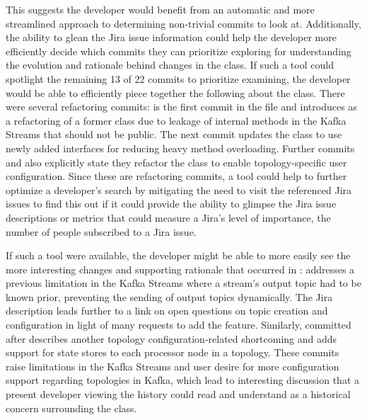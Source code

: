 This suggests the developer would benefit from an automatic and more streamlined approach to determining non-trivial commits to look at.
Additionally, the ability to glean the Jira issue information could help the developer more efficiently decide which commits they can prioritize exploring for understanding the evolution and rationale behind changes in the  class.
If such a tool could spotlight the remaining 13 of 22 commits to prioritize examining, the developer would be able to efficiently piece together the following about the  class. 
There were several refactoring commits:  is the first commit in the file and introduces  as a refactoring of a former class due to leakage of internal methods in the Kafka Streams  that should not be public. 
The next commit  updates the  class to use newly added interfaces for reducing heavy method overloading.
Further commits  and  also explicitly state they refactor the  class to enable topology-specific user configuration.
Since these are refactoring commits, a tool could help to further optimize a developer's search by mitigating the need to visit the referenced Jira issues to find this out if it could provide the ability to glimpse the Jira issue descriptions or metrics that could measure a Jira's level of importance, \eg the number of people subscribed to a Jira issue.

If such a tool were available, the developer might be able to more easily see the more interesting changes and supporting rationale that occurred in :
 addresses a previous limitation in the Kafka Streams  where a stream's output topic had to be known prior, preventing the sending of output topics dynamically. 
The Jira description leads further to a link on open questions on topic creation and configuration in light of many requests to add the feature.
Similarly,  committed after describes another topology configuration-related shortcoming and adds support for state stores to each processor node in a topology.
These commits raise limitations in the Kafka Streams  and user desire for more configuration support regarding topologies in Kafka, which lead to interesting discussion that a present developer viewing the history could read and understand as a historical concern surrounding the  class.

